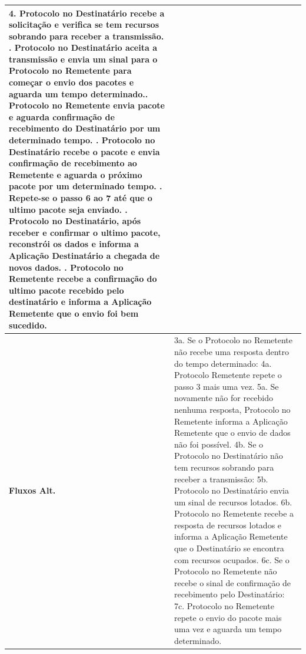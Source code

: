 \begin{longtable}{|p{2.65cm}|p{13cm}|}
    4. Protocolo no Destinatário recebe a solicitação e verifica se tem recursos sobrando para receber a transmissão. \newline
    5. Protocolo no Destinatário aceita a transmissão e envia um sinal para o Protocolo no Remetente para começar o envio dos pacotes e aguarda um tempo determinado.\newline
    6. Protocolo no Remetente envia pacote e aguarda confirmação de recebimento do Destinatário por um determinado tempo. \newline
    7. Protocolo no Destinatário recebe o pacote e envia confirmação de recebimento ao Remetente e aguarda o próximo pacote por um determinado tempo. \newline
    8. Repete-se o passo 6 ao 7 até que o ultimo pacote seja enviado. \newline
    9. Protocolo no Destinatário, após receber e confirmar o ultimo pacote, reconstrói os dados e informa a Aplicação Destinatário a chegada de novos dados. \newline
    10. Protocolo no Remetente recebe a confirmação do ultimo pacote recebido pelo destinatário e informa a Aplicação Remetente que o envio foi bem sucedido. \\
    \hline
    \textbf{Fluxos Alt.} & 3a. Se o Protocolo no Remetente não recebe uma resposta dentro do tempo determinado: \newline
    4a. Protocolo Remetente repete o passo 3 mais uma vez. \newline
    5a. Se novamente não for recebido nenhuma resposta, Protocolo no Remetente informa a Aplicação Remetente que o envio de dados não foi possível.
    \newline\newline
    4b. Se o Protocolo no Destinatário não tem recursos sobrando para receber a transmissão: \newline
    5b. Protocolo no Destinatário envia um sinal de recursos lotados. \newline
    6b. Protocolo no Remetente recebe a resposta de recursos lotados e informa a Aplicação Remetente que o Destinatário se encontra com recursos ocupados.
    \newline\newline
    6c. Se o Protocolo no Remetente não recebe o sinal de confirmação de recebimento pelo Destinatário: \newline
    7c. Protocolo no Remetente repete o envio do pacote mais uma vez e aguarda um tempo determinado. \newline

\end{longtable}
